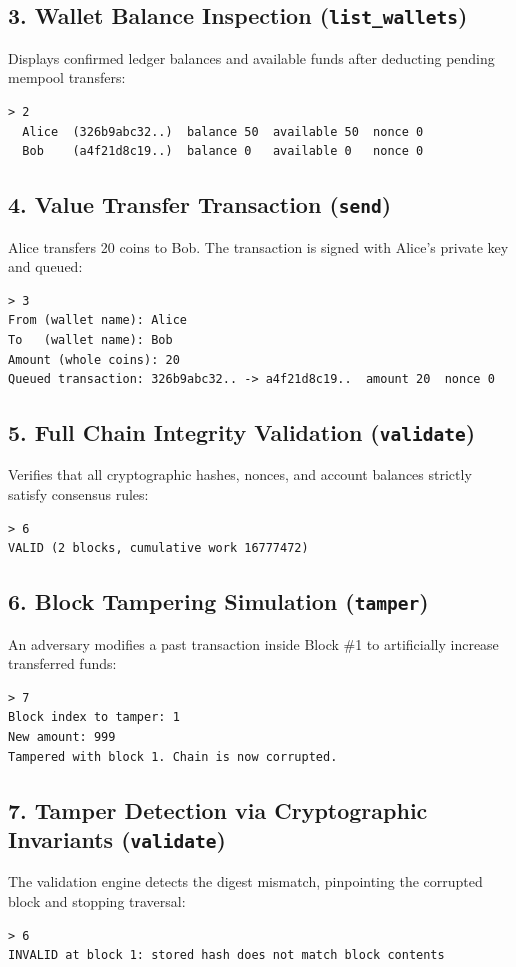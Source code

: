 \documentclass[11pt,a4paper]{report}
\begin{document}
\subsection*{3. Wallet Balance Inspection (\texttt{list\_wallets})}
Displays confirmed ledger balances and available funds after deducting pending mempool transfers:
\begin{lstlisting}
> 2
  Alice  (326b9abc32..)  balance 50  available 50  nonce 0
  Bob    (a4f21d8c19..)  balance 0   available 0   nonce 0
\end{lstlisting}

\subsection*{4. Value Transfer Transaction (\texttt{send})}
Alice transfers 20 coins to Bob. The transaction is signed with Alice's private key and queued:
\begin{lstlisting}
> 3
From (wallet name): Alice
To   (wallet name): Bob
Amount (whole coins): 20
Queued transaction: 326b9abc32.. -> a4f21d8c19..  amount 20  nonce 0
\end{lstlisting}

\subsection*{5. Full Chain Integrity Validation (\texttt{validate})}
Verifies that all cryptographic hashes, nonces, and account balances strictly satisfy consensus rules:
\begin{lstlisting}
> 6
VALID (2 blocks, cumulative work 16777472)
\end{lstlisting}

\subsection*{6. Block Tampering Simulation (\texttt{tamper})}
An adversary modifies a past transaction inside Block \#1 to artificially increase transferred funds:
\begin{lstlisting}
> 7
Block index to tamper: 1
New amount: 999
Tampered with block 1. Chain is now corrupted.
\end{lstlisting}

\subsection*{7. Tamper Detection via Cryptographic Invariants (\texttt{validate})}
The validation engine detects the digest mismatch, pinpointing the corrupted block and stopping traversal:
\begin{lstlisting}
> 6
INVALID at block 1: stored hash does not match block contents
\end{lstlisting}
\end{document}

